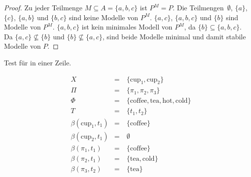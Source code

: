 \begin{proof}
    Zu jeder Teilmenge $M \subseteq A = \{ a, b, c \}$ ist $P^M = P$.
    Die Teilmengen~$\emptyset$, $\{ a \}$, $\{ c \}$, $\{ a, b \}$ und $\{ b, c \}$ sind keine Modelle von $P^M$. $\{ a, c \}$, $\{ a, b, c\}$ und $\{ b \}$ sind Modelle von $P^M$.
    $\{ a, b, c\}$ ist kein minimales Modell von $P^M$, da $\{ b \} \subseteq \{ a, b, c\}$.
    Da $\{ a, c \} \nsubseteq \{ b \}$ und $\{ b \} \nsubseteq \{ a, c \}$, sind beide Modelle minimal und damit stabile Modelle von $P$.
\end{proof}


Test für  in einer Zeile.

\begin{align*}
    &X                          &=\ &\{ \text{cup}_1, \text{cup}_2 \} \\
    &\Pi                        &=\ &\{ \pi_1, \pi_2, \pi_3 \} \\
    &\Phi                       &=\ &\{ \text{coffee}, \text{tea}, \text{hot}, \text{cold} \} \\
    &T                          &=\ &\{ t_1, t_2 \} \\
    &\beta(\text{cup}_1, t_1)   &=\ &\{ \text{coffee} \} \\
    &\beta(\text{cup}_2, t_1)   &=\ &\emptyset \\
    &\beta(\pi_1, t_1)          &=\ &\{ \text{coffee} \} \\
    &\beta(\pi_2, t_1)          &=\ &\{ \text{tea}, \text{cold} \} \\
    &\beta(\pi_3, t_2)          &=\ &\{ \text{tea} \}
\end{align*}


\cleardoublepage
